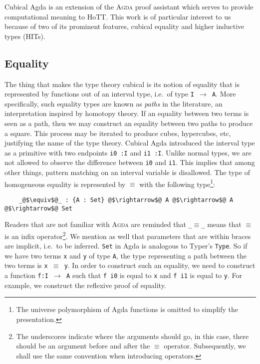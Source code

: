 \documentclass[12pt,twoside,maitrise]{dms}
\theoremstyle{definition}
\numberwithin{equation}{section}
\numberwithin{table}{chapter}
\numberwithin{figure}{chapter}
\newcommand\id[1] {\texttt{#1}}
\newcommand\fn[1] {\texttt{#1}}
\def\Agda{\textsc{Agda}\xspace}
\begin{document}
Cubical Agda\cite{vezzosi2021cubical} is an extension of the \Agda{} proof
assistant which serves to provide computational meaning to HoTT. This work is
of particular interest to us because of two of its prominent features, cubical
equality and higher inductive types (HITs).

\subsection{Equality} The thing that makes the type theory cubical is its
notion of equality that is represented by functions out of an interval type,
i.e.\ of type \fn{I $\rightarrow$ A}. More specifically, such equality types
are known as \emph{paths} in the literature, an interpretation inspired by
homotopy theory. If an equality between two terms is seen as a path, then we
may construct an equality between two paths to produce a square. This process
may be iterated to produce cubes, hypercubes, etc, justifying the name of the
type theory. Cubical Agda introduced the interval type as a primitive with two
endpoints \fn{i0 :\@ I} and \fn{i1 :\@ I}. Unlike normal types, we are not
allowed to observe the difference between \id{i0} and \id{i1}. This implies
that among other things, pattern matching on an interval variable is
disallowed. The type of homogeneous equality is represented by $\equiv$ with
the following type\footnote{The universe polymorphism of Agda functions is
omitted to simplify the presentation.}:

\begin{verbatim}
    _@$\equiv$@_ : {A : Set} @$\rightarrow$@ A @$\rightarrow$@ A @$\rightarrow$@ Set
\end{verbatim}

Readers that are not familiar with \Agda{} are reminded that \fn{\_$\equiv$\_}
means that $\equiv$ is an infix operator\footnote{The underscores indicate
  where the arguments should go, in this case, there should be an argument
  before and after the $\equiv$ operator. Subsequently, we shall use the same
convention when introducing operators.}. We mention as well that parameters
that are within braces are implicit, i.e.\ to be inferred. \id{Set} in Agda is
analogous to Typer's \id{Type}. So if we have two terms \id{x} and \id{y} of
type \id{A}, the type representing a path between the two terms is \fn{x
$\equiv$ y}. In order to construct such an equality, we need to construct a
function \id{f:I $\rightarrow$ A} such that \fn{f i0} is equal to \id{x} and
\fn{f i1} is equal to \id{y}. For example, we construct the reflexive proof of
equality.
\end{document}
